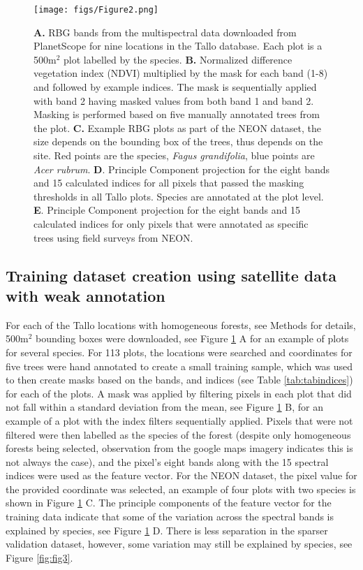 \documentclass[9pt,lineno]{elife}
\begin{document}
\begin{figure}
\begin{fullwidth}
\begin{center}
\texttt{[image: figs/Figure2.png]}
\caption{
        \textbf{A.} RBG bands from the multispectral  data downloaded from PlanetScope for nine locations in the Tallo database. Each plot is a 500m$^2$ plot labelled by the species.
        \textbf{B.} Normalized difference vegetation index (NDVI) multiplied by the mask for each band (1-8) and followed by example indices. The mask is sequentially applied with band 2 having masked values from both band 1 and band 2. Masking is performed based on five manually annotated trees from the plot.
        \textbf{C.} Example RBG plots as part of the NEON dataset, the size depends on the bounding box of the trees, thus depends on the site. Red points are the species, \textit{Fagus grandifolia}, blue points are \textit{Acer rubrum}.
        \textbf{D}. Principle Component projection for the eight bands and 15 calculated indices for all pixels that passed the masking thresholds in all Tallo plots. Species are annotated at the plot level.
        \textbf{E}. Principle Component projection for the eight bands and 15 calculated indices for only pixels that were annotated as specific trees using field surveys from NEON.
}
\label{fig:fig2}
\end{center}
\end{fullwidth}
\end{figure}

\subsection{Training dataset creation using satellite data with weak annotation}
For each of the Tallo locations with homogeneous forests, see Methods for details, 500m$^2$ bounding boxes were downloaded, see Figure \ref{fig:fig2} A for an example of plots for several species. For 113 plots, the locations were searched and coordinates for five trees were hand annotated to create a small training sample, which was used to then create masks based on the bands, and indices (see Table \ref{tab:tabindices}) for each of the plots. A mask was applied by filtering pixels in each plot that did not fall within a standard deviation from the mean, see Figure \ref{fig:fig2} B, for an example of a plot with the index filters sequentially applied. Pixels that were not filtered were then labelled as the species of the forest (despite only homogeneous forests being selected, observation from the google maps imagery indicates this is not always the case), and the pixel's eight bands along with the 15 spectral indices were used as the feature vector. For the NEON dataset, the pixel value for the provided coordinate was selected, an example of four plots with two species is shown in Figure \ref{fig:fig2} C. The principle components of the feature vector for the training data indicate that some of the variation across the spectral bands is explained by species, see Figure \ref{fig:fig2} D. There is less separation in the sparser validation dataset, however, some variation may still be explained by species, see Figure \ref{fig:fig3}.
\end{document}
